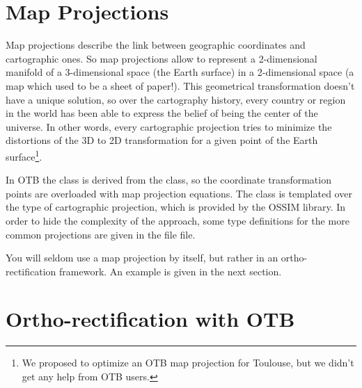   
\section{Map Projections}
\ifitkFullVersion
\label{sec:MapProjections}
\fi

Map projections describe the link between geographic coordinates and
cartographic ones. So map projections allow to represent a 2-dimensional manifold of a
3-dimensional space (the Earth surface) in a 2-dimensional space (a
map which used to be a sheet of paper!). This geometrical
transformation doesn't have a unique solution, so over the cartography
history, every country or region in the world has been able to express
the belief of being the center of the universe. In other words, every
cartographic projection tries to minimize the distortions of the 3D to
2D transformation for a given point of the Earth surface\footnote{We
  proposed to optimize an OTB map projection for Toulouse, but we
  didn't get any help from OTB users.}.

In OTB the  class is derived from the
 class, so the coordinate transformation
points are overloaded with map projection equations. The
 class is templated over the type of
cartographic projection, which is provided by the OSSIM library. In
order to hide the complexity of the approach, some type definitions
for the more common projections are given in the file
 file.

You will seldom use a map projection by itself, but rather in an
ortho-rectification framework. An example is given in the next section.




\section{Ortho-rectification with OTB}
\ifitkFullVersion
\label{sec:OrthorectificationwithOTB}

\fi

